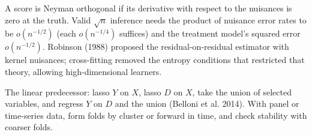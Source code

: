 \documentclass[11pt]{article}
\begin{document}
\sectionthree

\begin{extension}
A score is Neyman orthogonal if its derivative with respect to the nuisances is zero at the truth. Valid $\sqrt n$ inference needs the product of
nuisance error rates to be $o(n^{-1/2})$ (each $o(n^{-1/4})$ suffices) and the treatment model's squared error $o(n^{-1/2})$. Robinson (1988) proposed the
residual-on-residual estimator with kernel nuisances; cross-fitting removed the entropy conditions that restricted that theory, allowing
high-dimensional learners.
\end{extension}

\begin{extension}
The linear predecessor: lasso $Y$ on $X$, lasso $D$ on $X$, take the union of selected variables, and regress $Y$ on $D$ and the union (Belloni
et al. 2014).
 With panel or time-series data, form folds by cluster or forward in time, and check stability with coarser folds.
\end{extension}
\end{document}
